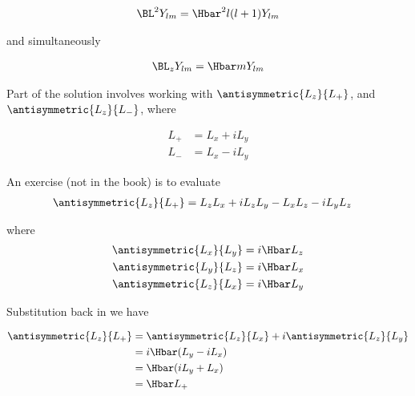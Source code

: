 \begin{equation}\label{eqn:lecture5BigReviewAngularMomentum:5300}
\begin{aligned}
\BL^2 Y_{lm} = \Hbar^2 l (l+1) Y_{lm}
\end{aligned}
\end{equation}

and simultaneously

\begin{equation}\label{eqn:lecture5BigReviewAngularMomentum:5320}
\begin{aligned}
\BL_z Y_{lm} = \Hbar m Y_{lm}
\end{aligned}
\end{equation}

Part of the solution involves working with \(\antisymmetric{L_z}{L_{+}}\), and \(\antisymmetric{L_z}{L_{-}}\), where

\begin{equation}\label{eqn:lecture5BigReviewAngularMomentum:5340}
\begin{aligned}
L_{+} &= L_x + i L_y \\
L_{-} &= L_x - i L_y
\end{aligned}
\end{equation}

An exercise (not in the book) is to evaluate
\begin{equation}\label{eqn:PHY356F:4000}
\begin{aligned}
\antisymmetric{L_z}{L_{+}}
&= L_z L_x + i L_z L_y - L_x L_z - i L_y L_z
\end{aligned}
\end{equation}

where
\begin{equation}\label{eqn:PHY356F:5000}
\begin{aligned}
\antisymmetric{L_x}{L_y}  &= i \Hbar L_z \\
\antisymmetric{L_y}{L_z}  &= i \Hbar L_x \\
\antisymmetric{L_z}{L_x}  &= i \Hbar L_y
\end{aligned}
\end{equation}

Substitution back in  we have

\begin{equation}\label{eqn:lecture5BigReviewAngularMomentum:5360}
\begin{aligned}
\antisymmetric{L_z}{L_{+}}
&=
\antisymmetric{L_z}{L_x}
+ i \antisymmetric{L_z}{L_y}  \\
&=
i \Hbar ( L_y - i L_x ) \\
&=
\Hbar ( i L_y +  L_x ) \\
&=
\Hbar L_{+}
\end{aligned}
\end{equation}
